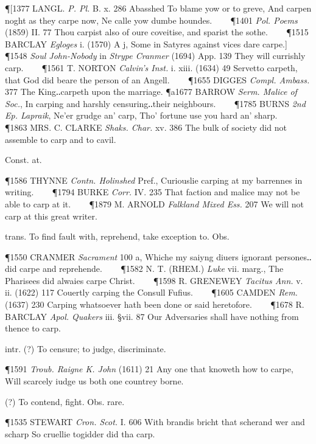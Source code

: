 \begin{description}[wide, labelwidth=!, labelindent=0pt]
\begin{myenumerate}
\P [1377 LANGL.  \textit{P. Pl.} B. x. 286 Abasshed To blame yow or to greve, And carpen noght as they carpe now, Ne calle yow dumbe houndes.    
\P 1401 \textit{Pol. Poems} (1859) II. 77 Thou carpist also of oure coveitise, and sparist the sothe.    
\P 1515 BARCLAY  \textit{Egloges} i. (1570) A j, Some in Satyres against vices dare carpe.]    
\P 1548 \textit{Soul  John-Nobody} in \textit{Strype Cranmer} (1694) App. 139 They will currishly carp.    
\P 1561 T. NORTON  \textit{Calvin's Inst.} i. xiii. (1634) 49 Servetto carpeth, that God did beare the person of an Angell.    
\P 1655 DIGGES  \textit{Compl. Ambass.} 377 The King‥carpeth upon the marriage.
\P a1677 BARROW  \textit{Serm. Malice of Soc.}, In carping and harshly censuring‥their neighbours.    
\P 1785 BURNS  \textit{2nd Ep. Lapraik}, Ne'er grudge an' carp, Tho' fortune use you hard an' sharp.    
\P 1863 MRS. C. CLARKE  \textit{Shaks. Char.} xv. 386 The bulk of society did not assemble to carp and to cavil.

 Const. at.

\P 1586 THYNNE  \textit{Contn. Holinshed} Pref., Curiouslie carping at my barrennes in writing.    
\P 1794 BURKE  \textit{Corr.} IV. 235 That faction and malice may not be able to carp at it.    
\P 1879 M. ARNOLD  \textit{Falkland Mixed Ess.} 207 We will not carp at this great writer.

 trans. To find fault with, reprehend, take exception to. Obs.

\P 1550 CRANMER  \textit{Sacrament} 100 a, Whiche my saiyng diuers ignorant persones‥did carpe and reprehende.    
\P 1582 N. T. (RHEM.)  \textit{Luke} vii. marg., The Pharisees did alwaies carpe Christ.    
\P 1598 R. GRENEWEY  \textit{Tacitus Ann.} v. ii. (1622) 117 Couertly carping the Consull Fufius.    
\P 1605 CAMDEN  \textit{Rem.} (1637) 230 Carping whatsoever hath been done or said heretofore.    
\P 1678 R. BARCLAY  \textit{Apol. Quakers} iii. §vii. 87 Our Adversaries shall have nothing from thence to carp.

 intr. (?) To censure; to judge, discriminate.

\P 1591 \textit{Troub.  Raigne K. John} (1611) 21 Any one that knoweth how to carpe, Will scarcely iudge us both one countrey borne.

 (?) To contend, fight. Obs. rare.

\P 1535 STEWART  \textit{Cron. Scot.} I. 606 With brandis bricht that scherand wer and scharp So cruellie togidder did tha carp.


\end{myenumerate}
\end{description}
